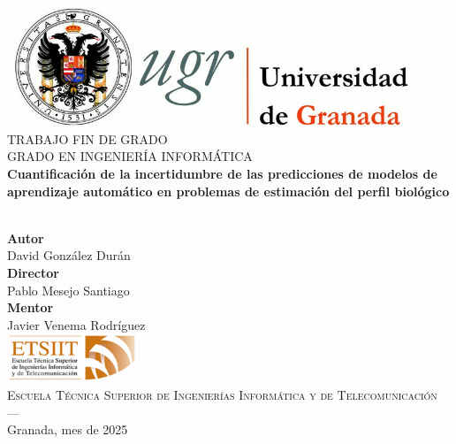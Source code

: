 \begin{titlepage}
\thispagestyle{empty}

\begin{center}
\includegraphics[width=0.9\textwidth]{portada/imagenes/logo_ugr.jpg}\\[1.4cm]

\textsc{ \Large TRABAJO FIN DE GRADO\\[0.2cm]}
\textsc{ GRADO EN INGENIERÍA INFORMÁTICA}\\[1cm]

{\LARGE \bfseries Cuantificación de la incertidumbre de las predicciones de modelos de aprendizaje automático en problemas de estimación del perfil biológico\\}
\noindent\\[3.5ex]
\end{center}

\vspace{0.5cm}

\begin{center}
\textbf{Autor}\\ {David González Durán}\\[2.5ex]
\textbf{Director}\\ {Pablo Mesejo Santiago}\\[2.5ex]
\textbf{Mentor}\\{Javier Venema Rodríguez}\\[2cm]
\includegraphics[width=0.3\textwidth]{portada/imagenes/etsiit_logo.png}\\[0.1cm]
\textsc{Escuela Técnica Superior de Ingenierías Informática y de Telecomunicación}\\
\textsc{---}\\
Granada, mes de 2025
\end{center}

\end{titlepage}
